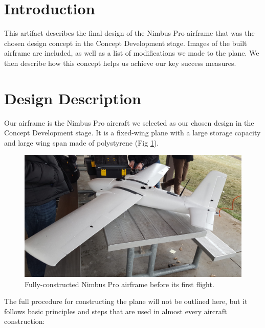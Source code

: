 \documentclass[]{auvsi_doc}
\begin{document}
\begin{AUVSITitlePage}
\begin{artifacttable}
\end{artifacttable}
\end{AUVSITitlePage}

\section{Introduction}
This artifact describes the final design of the Nimbus Pro airframe that was the chosen design concept in the Concept Development stage. Images of the built airframe are included, as well as a list of modifications we made to the plane. We then describe how this concept helps us achieve our key success measures.

\section{Design Description}
Our airframe is the Nimbus Pro aircraft we selected as our chosen design in the Concept Development stage. It is a fixed-wing plane with a large storage capacity and large wing span made of polystyrene (Fig \ref{fig:plane1}).

\begin{figure}[h!]
	\centering
	\includegraphics[width=.9\columnwidth]{plane1}
	\caption{Fully-constructed Nimbus Pro airframe before its first flight.}
	\label{fig:plane1}
\end{figure} 

The full procedure for constructing the plane will not be outlined here, but it follows basic principles and steps that are used in almost every aircraft construction:
\end{document}
